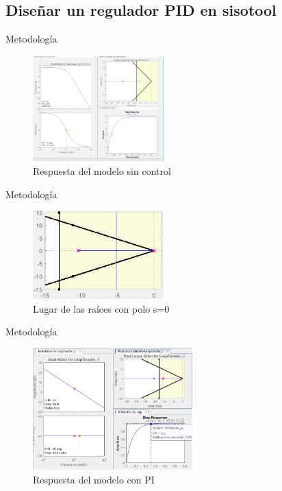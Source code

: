\documentclass[mathserif,spanish]{beamer}
\begin{document}
    \subsection{Diseñar un regulador PID en sisotool}
        \begin{frame}{Metodología}
               \item 
                 
        \begin{figure}[!h]
\centering
\includegraphics[width=0.45\textwidth]{img05.png}
\caption{Respuesta del modelo sin control}
\label{fig:rlocus1}
\end{figure}
        
        \end{frame}
    
        \begin{frame}{Metodología}
               \item 
                 
        \begin{figure}[!h]
\centering
\includegraphics[width=0.45\textwidth]{rlocuspolo.png}
\caption{Lugar de las raíces con polo s=0}
\label{fig:rlocusp}
\end{figure}
\end{frame}

        \begin{frame}{Metodología}
\begin{figure}[!h]
\centering
\includegraphics[width=0.55\textwidth]{final.png}
\caption{Respuesta del modelo con PI}
\label{fig:rfinal}
\end{figure}
        
        \end{frame}
\end{document}
